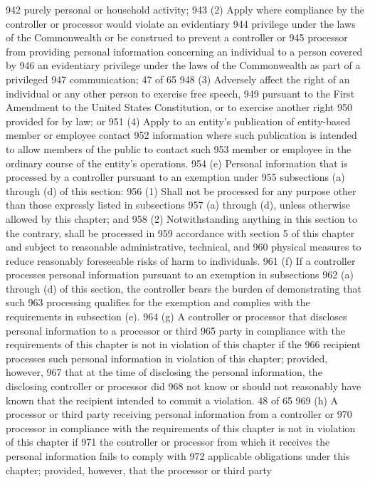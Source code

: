 942 purely personal or household activity;
943 (2) Apply where compliance by the controller or processor would violate an evidentiary
944 privilege under the laws of the Commonwealth or be construed to prevent a controller or
945 processor from providing personal information concerning an individual to a person covered by
946 an evidentiary privilege under the laws of the Commonwealth as part of a privileged
947 communication;
47 of 65
948 (3) Adversely affect the right of an individual or any other person to exercise free speech,
949 pursuant to the First Amendment to the United States Constitution, or to exercise another right
950 provided for by law; or
951 (4) Apply to an entity’s publication of entity-based member or employee contact
952 information where such publication is intended to allow members of the public to contact such
953 member or employee in the ordinary course of the entity’s operations.
954 (e) Personal information that is processed by a controller pursuant to an exemption under
955 subsections (a) through (d) of this section:
956 (1) Shall not be processed for any purpose other than those expressly listed in subsections
957 (a) through (d), unless otherwise allowed by this chapter; and
958 (2) Notwithstanding anything in this section to the contrary, shall be processed in
959 accordance with section 5 of this chapter and subject to reasonable administrative, technical, and
960 physical measures to reduce reasonably foreseeable risks of harm to individuals.
961 (f) If a controller processes personal information pursuant to an exemption in subsections
962 (a) through (d) of this section, the controller bears the burden of demonstrating that such
963 processing qualifies for the exemption and complies with the requirements in subsection (e).
964 (g) A controller or processor that discloses personal information to a processor or third
965 party in compliance with the requirements of this chapter is not in violation of this chapter if the
966 recipient processes such personal information in violation of this chapter; provided, however,
967 that at the time of disclosing the personal information, the disclosing controller or processor did
968 not know or should not reasonably have known that the recipient intended to commit a violation.
48 of 65
969 (h) A processor or third party receiving personal information from a controller or
970 processor in compliance with the requirements of this chapter is not in violation of this chapter if
971 the controller or processor from which it receives the personal information fails to comply with
972 applicable obligations under this chapter; provided, however, that the processor or third party
